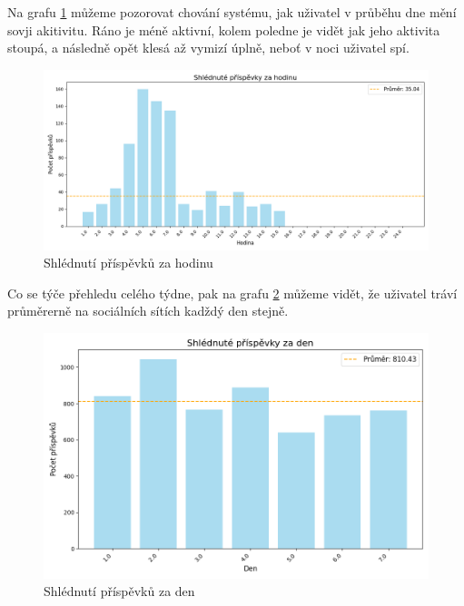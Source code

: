 \documentclass[11pt, a4paper]{article}
\begin{document}
Na grafu \ref{fig:Shlédnuté_příspěvky_za_hodinu} můžeme pozorovat chování systému, jak uživatel v průběhu dne mění sovji akitivitu.
Ráno je méně aktivní, kolem poledne je vidět jak jeho aktivita stoupá, a následně opět klesá až vymizí úplně, neboť v noci uživatel spí.
\begin{figure}[h]
    \centering
    \includegraphics[width=\linewidth]{Shlédnuté_příspěvky_za_hodinu.png}
    \caption{Shlédnutí příspěvků za hodinu}
    \label{fig:Shlédnuté_příspěvky_za_hodinu}
\end{figure}


Co se týče přehledu celého týdne, pak na grafu \ref{fig:Shlédnuté_příspěvky_za_den} můžeme vidět, že uživatel tráví průměrerně na sociálních sítích kadždý den stejně.
\begin{figure}[h]
    \centering
    \includegraphics[width=\linewidth]{Shlédnuté_příspěvky_za_den.png}
    \caption{Shlédnutí příspěvků za den}
    \label{fig:Shlédnuté_příspěvky_za_den}
\end{figure}
\end{document}
